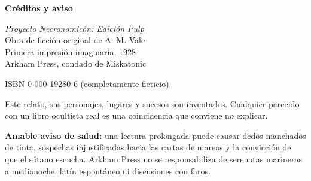 \thispagestyle{empty}
\vspace*{\fill}
\begin{center}
  {\Large\bfseries Créditos y aviso\par}
  \vspace{1em}
  \textit{Proyecto Necronomicón: Edición Pulp}\\
  Obra de ficción original de A. M. Vale\\
  Primera impresión imaginaria, 1928\\
  Arkham Press, condado de Miskatonic

  \vspace{1.5em}
  ISBN 0-000-19280-6 (completamente ficticio)

  \vspace{1.5em}
  Este relato, sus personajes, lugares y sucesos son inventados. Cualquier
  parecido con un libro ocultista real es una coincidencia que conviene no
  explicar.

  \vspace{1.5em}
  \textbf{Amable aviso de salud:} una lectura prolongada puede causar dedos
  manchados de tinta, sospechas injustificadas hacia las cartas de mareas y
  la convicción de que el sótano escucha. Arkham Press no se responsabiliza
  de serenatas marineras a medianoche, latín espontáneo ni discusiones con
  faros.
\end{center}
\vspace*{\fill}
\clearpage

